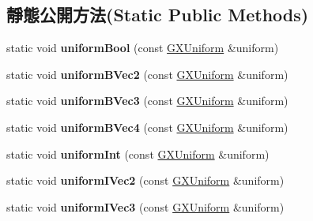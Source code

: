 \subsection*{靜態公開方法(Static Public Methods)}
\begin{DoxyCompactItemize}
\item 
static void {\bfseries uniform\+Bool} (const \hyperlink{class_magnum_1_1_g_x_uniform}{G\+X\+Uniform} \&uniform)\hypertarget{class_magnum_1_1_g_x_shader_program_a38cef979c750ab0f12540852cb5afae2}{}\label{class_magnum_1_1_g_x_shader_program_a38cef979c750ab0f12540852cb5afae2}

\item 
static void {\bfseries uniform\+B\+Vec2} (const \hyperlink{class_magnum_1_1_g_x_uniform}{G\+X\+Uniform} \&uniform)\hypertarget{class_magnum_1_1_g_x_shader_program_a4488386156d0c60d25d4c912d7a149ba}{}\label{class_magnum_1_1_g_x_shader_program_a4488386156d0c60d25d4c912d7a149ba}

\item 
static void {\bfseries uniform\+B\+Vec3} (const \hyperlink{class_magnum_1_1_g_x_uniform}{G\+X\+Uniform} \&uniform)\hypertarget{class_magnum_1_1_g_x_shader_program_a935ee5a17d53700c577516cb4b24bc59}{}\label{class_magnum_1_1_g_x_shader_program_a935ee5a17d53700c577516cb4b24bc59}

\item 
static void {\bfseries uniform\+B\+Vec4} (const \hyperlink{class_magnum_1_1_g_x_uniform}{G\+X\+Uniform} \&uniform)\hypertarget{class_magnum_1_1_g_x_shader_program_ad97944af86322788301972e01ca0322e}{}\label{class_magnum_1_1_g_x_shader_program_ad97944af86322788301972e01ca0322e}

\item 
static void {\bfseries uniform\+Int} (const \hyperlink{class_magnum_1_1_g_x_uniform}{G\+X\+Uniform} \&uniform)\hypertarget{class_magnum_1_1_g_x_shader_program_a2f816f97a6f1394678250c67cf7f134e}{}\label{class_magnum_1_1_g_x_shader_program_a2f816f97a6f1394678250c67cf7f134e}

\item 
static void {\bfseries uniform\+I\+Vec2} (const \hyperlink{class_magnum_1_1_g_x_uniform}{G\+X\+Uniform} \&uniform)\hypertarget{class_magnum_1_1_g_x_shader_program_a856251f0b36f652156e66da0da3d3b6d}{}\label{class_magnum_1_1_g_x_shader_program_a856251f0b36f652156e66da0da3d3b6d}

\item 
static void {\bfseries uniform\+I\+Vec3} (const \hyperlink{class_magnum_1_1_g_x_uniform}{G\+X\+Uniform} \&uniform)\hypertarget{class_magnum_1_1_g_x_shader_program_ae389a4f0e8337ac02be6c002a420b965}{}\label{class_magnum_1_1_g_x_shader_program_ae389a4f0e8337ac02be6c002a420b965}


\end{DoxyCompactItemize}
